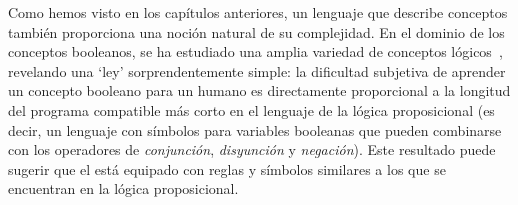 
Como hemos visto en los capítulos anteriores, un lenguaje que describe conceptos también proporciona una noción natural de su complejidad. En el dominio de los conceptos booleanos, se ha estudiado una amplia variedad de conceptos lógicos~\cite{feldman2003simplicity}, revelando una `ley' sorprendentemente simple: la dificultad subjetiva de aprender un concepto booleano para un humano es directamente proporcional a la longitud del programa compatible más corto en el lenguaje de la lógica proposicional (es decir, un lenguaje con símbolos para variables booleanas que pueden combinarse con los operadores de \textit{conjunción}, \textit{disyunción} y \textit{negación}). Este resultado puede sugerir que el \lot está equipado con reglas y símbolos similares a los que se encuentran en la lógica proposicional.


